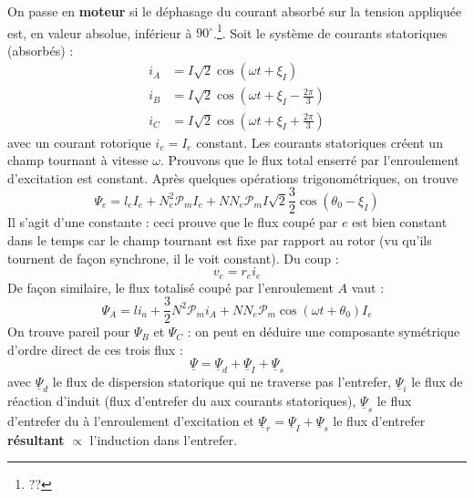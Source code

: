 		On passe en \textbf{moteur} si le déphasage du courant absorbé sur la tension 
		appliquée est, en valeur absolue, inférieur à $90^\circ$.\footnote{??}. Soit 
		le système de courants statoriques (absorbés) :
		\begin{equation}
		\begin{array}{ll}
		i_A &= I\sqrt{2}\cos(\omega t + \xi_I)\\
		i_B &= I\sqrt{2}\cos(\omega t + \xi_I - \frac{2\pi}{3})\\
		i_C &= I\sqrt{2}\cos(\omega t + \xi_I+\frac{2\pi}{3})				
		\end{array}
		\end{equation}
		avec un courant rotorique $i_e=I_e$ constant. Les courants statoriques 
		créent un champ tournant à vitesse $\omega$. Prouvons que le flux total 
		enserré par l'enroulement d'excitation est constant. Après quelques 
		opérations trigonométriques, on trouve
		\begin{equation}
		\Psi_e = l_eI_e + N_e^2\mathcal{P}_mI_e + NN_e\mathcal{P}_mI\sqrt{2}
		\frac{3}{2}\cos(\theta_0-\xi_I)
		\end{equation}
		Il s'agit d'une constante : ceci prouve que le flux coupé par $e$ est bien 
		constant dans le temps car le champ tournant est fixe par rapport au rotor 
		(vu qu'ils tournent de façon synchrone, il le voit constant). Du coup :
		\begin{equation}
		v_e = r_ei_e
		\end{equation}
		De façon similaire, le flux totalisé coupé par l'enroulement $A$ vaut :
		\begin{equation}
		\Psi_A = li_a + \frac{3}{2}N^2\mathcal{P}_mi_A + NN_e\mathcal{P}_m\cos
		(\omega t+ \theta_0)I_e
		\end{equation}
		On trouve pareil pour $\Psi_B$ et $\Psi_C$ : on peut en déduire une 
		composante symétrique d'ordre direct de ces trois flux :
		\begin{equation}
		\underline{\Psi} = \underline{\Psi}_d+\underline{\Psi}_I+\underline{\Psi}_s
		\end{equation}
		avec $\underline{\Psi}_d$ le flux de dispersion statorique qui ne traverse 
		pas l'entrefer, $\underline{\Psi}_i$ le flux de réaction d'induit (flux d'entrefer 
		du aux courants statoriques), $\underline{\Psi}_s$ le flux d’entrefer 
		du à l'enroulement d'excitation et $\underline{\Psi}_r = \underline{\Psi}_I
		+\underline{\Psi}_s$ le flux d'entrefer \textbf{résultant} $\propto$ 
		l'induction dans l'entrefer.\\
		
